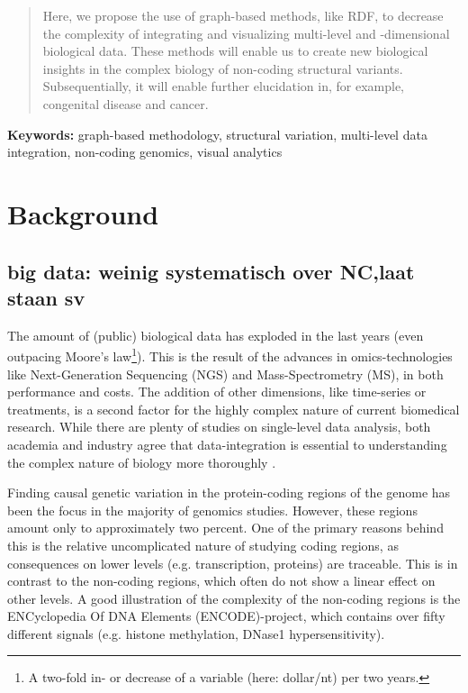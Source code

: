 \documentclass[twoside,fontsize=12pt]{article}
\begin{document}
\begin{abstract}
\noindent Here, we propose the use of graph-based methods, like RDF, to decrease the complexity of integrating and visualizing multi-level and -dimensional biological data. These methods will enable us to create new biological insights in the complex biology of non-coding structural variants. Subsequentially, it will enable further elucidation in, for example, congenital disease and cancer. 
\end{abstract}
\medskip

\noindent \textbf{Keywords:} graph-based methodology, structural variation, multi-level data integration, non-coding genomics, visual analytics

\newpage

\section*{Background}
\subsection*{	big data: weinig systematisch over NC,laat staan sv}
The amount of (public) biological data has exploded in the last years (even outpacing Moore's law\footnote{A two-fold in- or decrease of a variable (here: dollar/nt) per two years.}). This is the result of the advances in omics-technologies like Next-Generation Sequencing (NGS) and Mass-Spectrometry (MS), in both performance and costs. The addition of other dimensions, like time-series or treatments, is a second factor for the highly complex nature of current biomedical research. While there are plenty of studies on single-level data analysis, both academia and industry agree that data-integration is essential to understanding the complex nature of biology more thoroughly \citep{Gomez-Cabrero2014, Huttenhower2010, Searls2005, Hamid2009}. 

Finding causal genetic variation in the protein-coding regions of the genome has been the focus in the majority of genomics studies. However, these regions amount only to approximately two percent\cite{Lander2001}. One of the primary reasons behind this is the relative uncomplicated nature of studying coding regions, as consequences on lower levels (e.g. transcription, proteins) are traceable\cite{McLaren2010}. This is in contrast to the non-coding regions, which often do not show a linear effect on other levels\cite{Bird2006}. A good illustration of the complexity of the non-coding regions is the ENCyclopedia Of DNA Elements (ENCODE)-project\cite{ENCODE}, which contains over fifty different signals (e.g. histone methylation, DNase1 hypersensitivity). 
\end{document}
